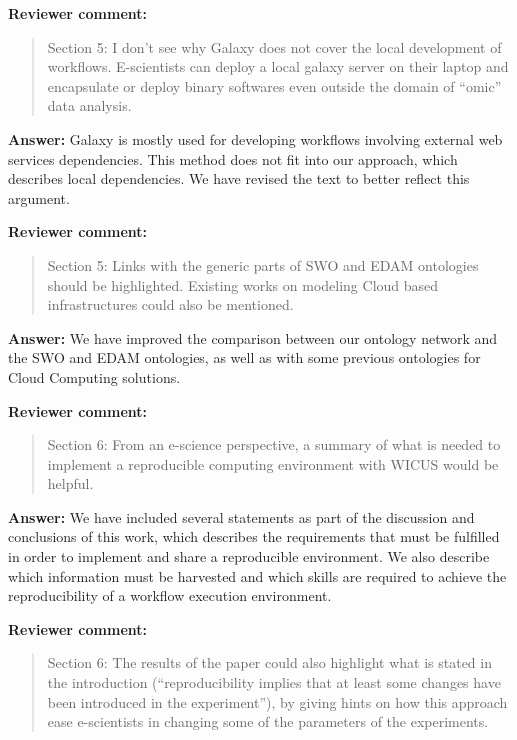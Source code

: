 \documentclass{letter}
\newenvironment{review}%
{\textbf{Reviewer comment:}\begin{quote}}%
{\end{quote}}%
\newcommand{\answer}[1]{%
      \textbf{Answer:} #1}
\begin{document}
\begin{letter}{}
\begin{review}
Section 5: I don't see why Galaxy does not cover the local development of workflows. E-scientists can deploy a local galaxy server on their laptop and encapsulate or deploy binary softwares even outside the domain of ``omic'' data analysis.
\end{review}

\answer{Galaxy is mostly used for developing workflows involving external web services dependencies. This method does not fit into our approach, which describes local dependencies. We have revised the text to better reflect this argument.} 



\begin{review}
Section 5: Links with the generic parts of SWO and EDAM ontologies should be highlighted. Existing works on modeling Cloud based infrastructures could also be mentioned.
\end{review}

\answer{We have improved the comparison between our ontology network and the SWO and EDAM ontologies, as well as with some previous ontologies for Cloud Computing solutions.}


\begin{review}
Section 6: From an e-science perspective, a summary of what is needed to implement a reproducible computing environment with WICUS would be helpful.
\end{review}

\answer{We have included several statements as part of the discussion and conclusions of this work, which describes the requirements that must be fulfilled in order to implement and share a reproducible environment. We also describe which information must be harvested and which skills are required to achieve the reproducibility of a workflow execution environment.}


\begin{review}
Section 6: The results of the paper could also highlight what is stated in the introduction (``reproducibility implies that at least some changes have been introduced in the experiment''), by giving hints on how this approach ease e-scientists in changing some of the parameters of the experiments.
\end{review}


\end{letter}
\end{document}
